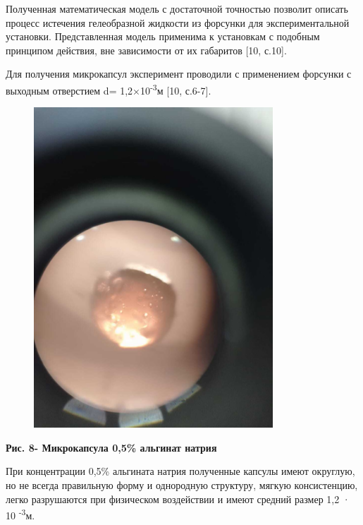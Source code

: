 Полученная математическая модель с достаточной точностью позволит
описать процесс истечения гелеобразной жидкости из форсунки для
экспериментальной установки. Представленная модель применима к
установкам с подобным принципом действия, вне зависимости от их
габаритов {[}10, с.10{]}.

Для получения микрокапсул эксперимент проводили с применением форсунки с
выходным отверстием d= 1,2×10\textsuperscript{-3}м {[}10, с.6-7{]}.

\begin{figure}[H]
	\centering
	\includegraphics[width=0.8\textwidth]{assets/323}
	\caption*{}
\end{figure}

{\bfseries Рис. 8- Микрокапсула 0,5\% альгинат натрия}

При концентрации 0,5\% альгината натрия полученные капсулы имеют
округлую, но не всегда правильную форму и однородную структуру, мягкую
консистенцию, легко разрушаются при физическом воздействии и имеют
средний размер 1,2 · 10 \textsuperscript{-3}м.

